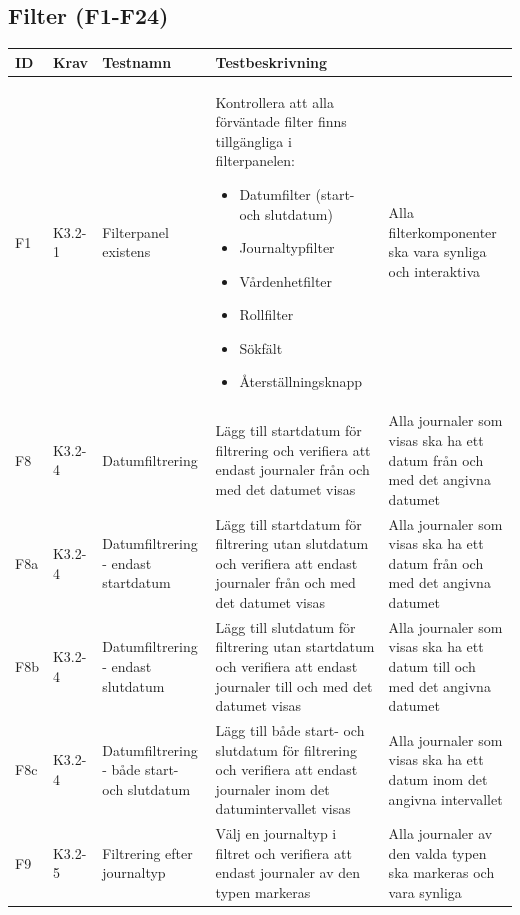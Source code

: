 \documentclass[a3paper,landscape]{article}
\begin{document}
\begin{Form}
\subsection{Filter (F1-F24)}
\begin{tabular}{|p{1cm}|p{2.5cm}|p{4cm}|p{8cm}|}
\hline
\textbf{ID} & \textbf{Krav} & \textbf{Testnamn} & \textbf{Testbeskrivning} \\
\hline
F1 & K3.2-1 & Filterpanel existens & 
Kontrollera att alla förväntade filter finns tillgängliga i filterpanelen:
\begin{itemize}
    \item Datumfilter (start- och slutdatum)
    \item Journaltypfilter
    \item Vårdenhetfilter
    \item Rollfilter
    \item Sökfält
    \item Återställningsknapp
\end{itemize} & 
Alla filterkomponenter ska vara synliga och interaktiva &
\\\hline

F8 & K3.2-4 & Datumfiltrering &
Lägg till startdatum för filtrering och verifiera att endast journaler från och med det datumet visas &
Alla journaler som visas ska ha ett datum från och med det angivna datumet &
\\\hline

F8a & K3.2-4 & Datumfiltrering - endast startdatum &
Lägg till startdatum för filtrering utan slutdatum och verifiera att endast journaler från och med det datumet visas &
Alla journaler som visas ska ha ett datum från och med det angivna datumet &
\\\hline

F8b & K3.2-4 & Datumfiltrering - endast slutdatum &
Lägg till slutdatum för filtrering utan startdatum och verifiera att endast journaler till och med det datumet visas &
Alla journaler som visas ska ha ett datum till och med det angivna datumet &
\\\hline

F8c & K3.2-4 & Datumfiltrering - både start- och slutdatum &
Lägg till både start- och slutdatum för filtrering och verifiera att endast journaler inom det datumintervallet visas &
Alla journaler som visas ska ha ett datum inom det angivna intervallet &
\\\hline

F9 & K3.2-5 & Filtrering efter journaltyp &
Välj en journaltyp i filtret och verifiera att endast journaler av den typen markeras &
Alla journaler av den valda typen ska markeras och vara synliga &
\\\hline


\end{tabular}
\end{Form}
\end{document}
